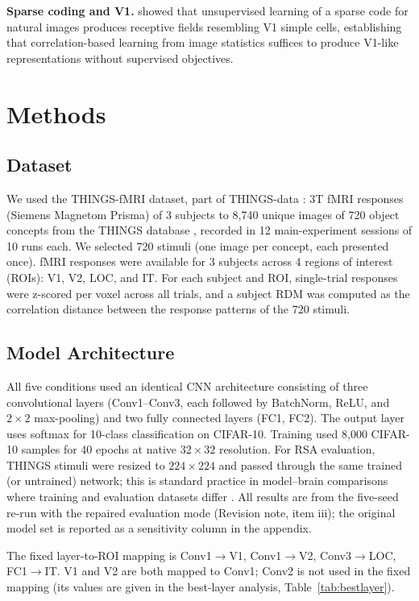 \documentclass[10pt,twocolumn]{article}
\begin{document}
\textbf{Sparse coding and V1.} \citet{olshausen1996} showed that unsupervised learning of a sparse code for natural images produces receptive fields resembling V1 simple cells, establishing that correlation-based learning from image statistics suffices to produce V1-like representations without supervised objectives.

\section{Methods}

\subsection{Dataset}

We used the THINGS-fMRI dataset, part of THINGS-data \citep{hebart2023}: 3T fMRI responses (Siemens Magnetom Prisma) of 3 subjects to 8{,}740 unique images of 720 object concepts from the THINGS database \citep{hebart2019}, recorded in 12 main-experiment sessions of 10 runs each. We selected 720 stimuli (one image per concept, each presented once). fMRI responses were available for 3 subjects across 4 regions of interest (ROIs): V1, V2, LOC, and IT. For each subject and ROI, single-trial responses were z-scored per voxel across all trials, and a subject RDM was computed as the correlation distance between the response patterns of the 720 stimuli.

\subsection{Model Architecture}

All five conditions used an identical CNN architecture consisting of three convolutional layers (Conv1--Conv3, each followed by BatchNorm, ReLU, and $2\times2$ max-pooling) and two fully connected layers (FC1, FC2). The output layer uses softmax for 10-class classification on CIFAR-10. Training used 8,000 CIFAR-10 samples for 40 epochs at native $32\times32$ resolution. For RSA evaluation, THINGS stimuli were resized to $224\times224$ and passed through the same trained (or untrained) network; this is standard practice in model--brain comparisons where training and evaluation datasets differ \citep{schrimpf2020}. All results are from the five-seed re-run with the repaired evaluation mode (Revision note, item iii); the original model set is reported as a sensitivity column in the appendix.

The fixed layer-to-ROI mapping is Conv1$\to$V1, Conv1$\to$V2, Conv3$\to$LOC, FC1$\to$IT. V1 and V2 are both mapped to Conv1; Conv2 is not used in the fixed mapping (its values are given in the best-layer analysis, Table~\ref{tab:bestlayer}).
\end{document}
